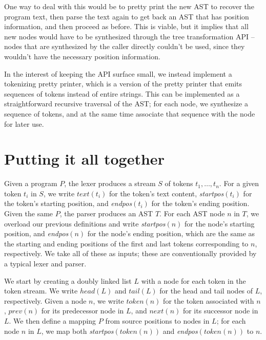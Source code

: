 One way to deal with this would be to pretty print the new AST to recover the
program text, then parse the text again to get back an AST that has position
information, and then proceed as before. This is viable, but it implies that
all new nodes would have to be synthesized through the tree transformation API
-- nodes that are synthesized by the caller directly couldn't be used, since
they wouldn't have the necessary position information.

In the interest of keeping the API surface small, we instead implement a
tokenizing pretty printer, which is a version of the pretty printer that emits
sequences of tokens instead of entire strings. This can be implemented as a
straightforward recursive traversal of the AST; for each node, we synthesize a
sequence of tokens, and at the same time associate that sequence with the node
for later use.

\section{Putting it all together}

Given a program $P$, the lexer produces a stream $S$ of tokens $t_1, \dots,
t_n$. For a given token $t_i$ in $S$, we write $text(t_i)$ for the token's text
content, \emph{startpos}$(t_i)$ for the token's starting position, and
\emph{endpos}$(t_i)$ for the token's ending position. Given the same $P$, the
parser produces an AST $T$. For each AST node $n$ in $T$, we overload our
previous definitions and write \emph{startpos}$(n)$ for the node's starting position,
and \emph{endpos}$(n)$ for the node's ending position, which are the same as the
starting and ending positions of the first and last tokens corresponding to $n$,
respectively. We take all of these as inputs; these are conventionally provided
by a typical lexer and parser.

We start by creating a doubly linked list $L$ with a node for each token in the
token stream. We write $head(L)$ and $tail(L)$ for the head and tail nodes of
$L$, respectively. Given a node $n$, we write $token(n)$ for the token
associated with $n$, $prev(n)$ for its predecessor node in $L$, and $next(n)$
for its successor node in $L$. We then define a mapping $P$ from source
positions to nodes in $L$; for each node $n$ in $L$, we map both
\emph{startpos}$(token(n))$ and \emph{endpos}$(token(n))$ to $n$.

